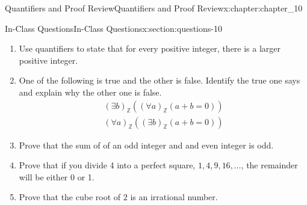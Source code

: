 \documentclass[oneside,10pt,]{book}
\numberwithin{equation}{section}
\begin{document}
\begin{chapterptx}{Quantifiers and Proof Review}{}{Quantifiers and Proof Review}{}{}{x:chapter:chapter_10}
\begin{sectionptx}{In-Class Questions}{}{In-Class Questions}{}{}{x:section:questions-10}
\begin{enumerate}[label=\arabic*.]
\begin{enumerate}[label=(\alph*)]
\item{}No number is both even and odd.%
\item{}One more than any even number is an odd number.%
\item{}There is prime number that is even.%
\item{}Between any two numbers there is a third number.%
\item{}There is no number between a number and one more than that number.%
\end{enumerate}
%
\item{}Use quantifiers to state that for every positive integer, there is a larger positive integer.%
\item{}One of the following is true and the other is false.  Identify the true one says and explain why the other one is false.%
\begin{gather*}
(\exists  b)_{\mathbb{Z}} ((\forall a)_{\mathbb{Z}}(a + b = 0))\\
(\forall  a)_{\mathbb{Z}} ((\exists b)_{\mathbb{Z}}(a + b = 0))
\end{gather*}
%
\item{}Prove that the sum of of an odd integer and and even integer is odd.%
\item{}Prove that if you divide 4 into a perfect square, \(1, 4, 9, 16, \dots\), the remainder will be either 0 or 1.%
\item{}Prove that the cube root of \(2\) is an irrational number.%
\end{enumerate}
%
\end{sectionptx}
\end{chapterptx}
%
%
\typeout{************************************************}
\typeout{************************************************}
%
\end{document}
